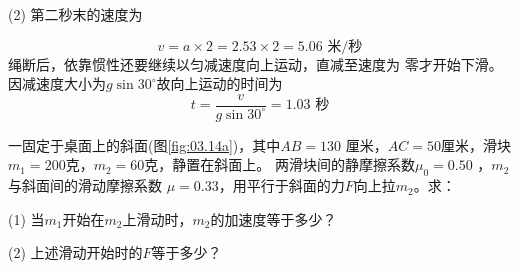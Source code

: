 (2) 第二秒末的速度为

\vspace{-1.56em}
\begin{equation*}
  v = a \times 2 = 2 . 5 3 \times 2 = 5 . 0 6 \text{ 米/秒}
\end{equation*}
绳断后，依靠惯性还要继续以匀减速度向上运动，直减至速度为
零才开始下滑。因减速度大小为$ g \sin 3 0 ^ { \circ } $故向上运动的时间为
\begin{equation*}
  t = \frac { v } { g \sin 3 0 ^ { \circ } } = 1 . 0 3\text{ 秒}
\end{equation*}

\example 一固定于桌面上的斜面(图\ref{fig:03.14a})，其中$ A B = 1 3 0 $
厘米，$ A C = 5 0 $厘米，滑块$ m _ { 1 } = 2 0 0 $克，$ m _ { 2 } = 6 0 $克，静置在斜面上。
两滑块间的静摩擦系数$ \mu _ { 0 } = 0 . 5 0 $ ，$m_2$与斜面间的滑动摩擦系数
$ \mu = 0 . 3 3 $，用平行于斜面的力$ F $向上拉$m_2$。求：

(1) 当$m_1$开始在$m_2$上滑动时，$m_2$的加速度等于多少？

(2) 上述滑动开始时的$ F $等于多少？
\begin{figure}[h]
  \vspace{-0.5em}
  \centering
  \\
   \qquad
  \caption{}
  \label{fig:03.14}
  \vspace{-0.5em}
\end{figure}


